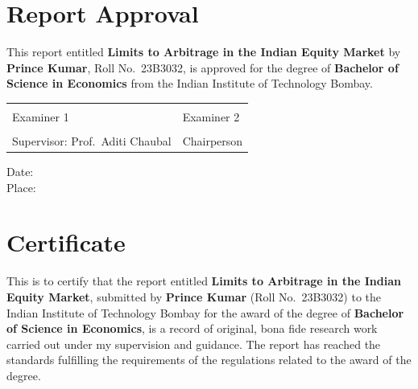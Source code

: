 \frontmatter
\pagestyle{body}
\setcounter{page}{1}

\chapter*{Report Approval}
\thispagestyle{plain}
This report entitled \textbf{Limits to Arbitrage in the Indian Equity Market} by \textbf{Prince Kumar}, Roll No.\
23B3032, is approved for the degree of \textbf{Bachelor of Science in Economics} from the Indian Institute of Technology
Bombay.

\vspace{2.6cm}
\noindent
\begin{tabularx}{\linewidth}{@{}X X@{}}
\dotfill\hspace*{2cm} & \hspace*{1.5cm}\dotfill \\
Examiner 1 & \hspace*{1.5cm}Examiner 2 \\[2.4cm]
\dotfill\hspace*{2cm} & \hspace*{1.5cm}\dotfill \\
Supervisor: Prof.\ Aditi Chaubal & \hspace*{1.5cm}Chairperson \\
\end{tabularx}

\vspace{2cm}
\noindent Date: \dotfill\hspace*{9cm}\\[0.6cm]
Place: \dotfill\hspace*{9cm}

\chapter*{Certificate}
\thispagestyle{plain}
This is to certify that the report entitled \textbf{Limits to Arbitrage in the Indian Equity Market}, submitted by
\textbf{Prince Kumar} (Roll No.\ 23B3032) to the Indian Institute of Technology Bombay for the award of the degree of
\textbf{Bachelor of Science in Economics}, is a record of original, bona fide research work carried out under my
supervision and guidance. The report has reached the standards fulfilling the requirements of the regulations related
to the award of the degree.

